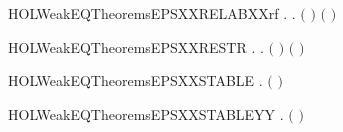 \newcommand{\HOLWeakEQTheoremsEPSXXRELAB}{\UseVerbatim{HOLWeakEQTheoremsEPSXXRELAB}}
\begin{SaveVerbatim}{HOLWeakEQTheoremsEPSXXRELABXXrf}
\HOLTokenTurnstile{} \HOLSymConst{\HOLTokenForall{}} .    \HOLSymConst{\HOLTokenImp{}} \HOLSymConst{\HOLTokenForall{}}.  \ensuremath{(}  \ensuremath{)} \ensuremath{(}  \ensuremath{)}
\end{SaveVerbatim}
\newcommand{\HOLWeakEQTheoremsEPSXXRELABXXrf}{\UseVerbatim{HOLWeakEQTheoremsEPSXXRELABXXrf}}
\begin{SaveVerbatim}{HOLWeakEQTheoremsEPSXXRESTR}
\HOLTokenTurnstile{} \HOLSymConst{\HOLTokenForall{}} .    \HOLSymConst{\HOLTokenImp{}} \HOLSymConst{\HOLTokenForall{}}.  \ensuremath{(}  \ensuremath{)} \ensuremath{(}  \ensuremath{)}
\end{SaveVerbatim}
\newcommand{\HOLWeakEQTheoremsEPSXXRESTR}{\UseVerbatim{HOLWeakEQTheoremsEPSXXRESTR}}
\begin{SaveVerbatim}{HOLWeakEQTheoremsEPSXXSTABLE}
\HOLTokenTurnstile{} \HOLSymConst{\HOLTokenForall{}} .    \HOLSymConst{\HOLTokenImp{}}   \HOLSymConst{\HOLTokenImp{}} \ensuremath{(} \HOLSymConst{\ensuremath{=}} \ensuremath{)}
\end{SaveVerbatim}
\newcommand{\HOLWeakEQTheoremsEPSXXSTABLE}{\UseVerbatim{HOLWeakEQTheoremsEPSXXSTABLE}}
\begin{SaveVerbatim}{HOLWeakEQTheoremsEPSXXSTABLEYY}
\HOLTokenTurnstile{} \HOLSymConst{\HOLTokenForall{}} .    \HOLSymConst{\HOLTokenConj{}}   \HOLSymConst{\HOLTokenImp{}} \ensuremath{(} \HOLSymConst{\ensuremath{=}} \ensuremath{)}
\end{SaveVerbatim}
\newcommand{\HOLWeakEQTheoremsEPSXXSTABLEYY}{\UseVerbatim{HOLWeakEQTheoremsEPSXXSTABLEYY}}
